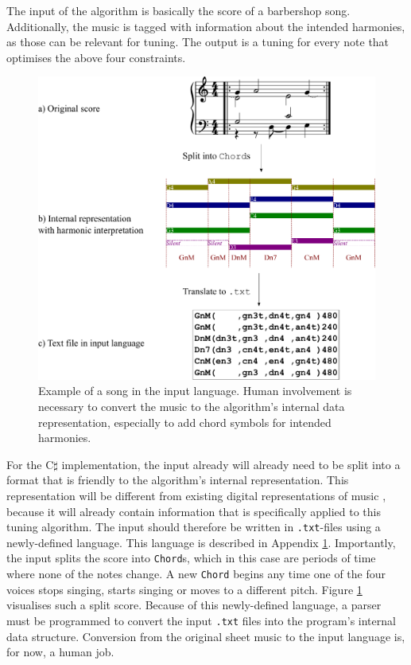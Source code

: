 \documentclass[a4paper]{article}
\begin{document}
The input of the algorithm is basically the score of a barbershop song. Additionally, the music is tagged with information about the intended harmonies, as those can be relevant for tuning. The output is a tuning for every note that optimises the above four constraints.

\begin{figure}
	\centering
	\includegraphics[height=0.35\textheight]{Figures/benedettiV.pdf}
	\caption{Example of a song in the input language. Human involvement is necessary to convert the music to the algorithm's internal data representation, especially to add chord symbols for intended harmonies.}
	\label{fig:input}
\end{figure}

For the C$\sharp$ implementation, the input already will already need to be split into a format that is friendly to the algorithm's internal representation. This representation will be different from existing digital representations of music \cite{midi_manufacturers_association_complete_2014, de_haas_music_2012, hsiao_compound_2021}, because it will already contain information that is specifically applied to this tuning algorithm. The input should therefore be written in \texttt{.txt}-files using a newly-defined language. This language is described in Appendix \ref{fig:input}. Importantly, the input splits the score into \texttt{Chord}s, which in this case are periods of time where none of the notes change. A new \texttt{Chord} begins any time one of the four voices stops singing, starts singing or moves to a different pitch. Figure \ref{fig:input} visualises such a split score. Because of this newly-defined language, a parser must be programmed to convert the input \texttt{.txt} files into the program's internal data structure. Conversion from the original sheet music to the input language is, for now, a human job.
\end{document}
